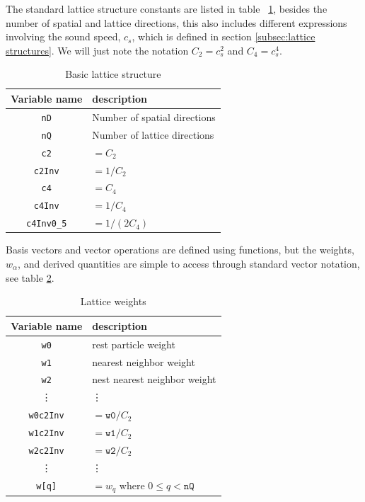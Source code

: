 \documentclass[11pt,a4paper]{report}
\begin{document}
The standard lattice structure constants are listed in table ~\ref{tab:basic lattice structure}, besides the number of spatial and lattice directions, this also includes different expressions involving the sound speed, $c_s$, which is defined in section \ref{subsec:lattice structures}. We will just note the notation $C_2=c_s^2$ and $C_4=c_s^4$.   
\begin{table}[h]
	\centering
	\begin{tabular}{|c|l|}\hline
		Variable name & description \\ \hline
		\texttt{nD} & Number of spatial directions \\ 
		\texttt{nQ} & Number of lattice directions \\ \hline
		\texttt{c2} & $=C_2$ \\ 
		\texttt{c2Inv} & $=1/C_2$ \\ \hline
		\texttt{c4} & $=C_4$ \\ 
		\texttt{c4Inv} & $=1/C_4$ \\ 
		\texttt{c4Inv0{\_}5} & $=1/(2C_4)$ \\ \hline
	\end{tabular}
	\caption{Basic lattice structure}
	\label{tab:basic lattice structure}
\end{table}
Basis vectors and vector operations are defined using functions, but the weights, $w_\alpha$, and derived quantities are simple to access through standard vector notation, see table \ref{tab:lattice weights}.
\begin{table}
	\centering
	\begin{tabular}{|c|l|}\hline
		Variable name & description \\ \hline
		\texttt{w0} & rest particle weight \\ 
		\texttt{w1} & nearest neighbor weight \\ 
		\texttt{w2} & nest nearest neighbor weight \\ 
		\vdots & \vdots \\ \hline
		\texttt{w0c2Inv} & $=\texttt{w0}/C_2$ \\ 
		\texttt{w1c2Inv} & $=\texttt{w1}/C_2$ \\ 
		\texttt{w2c2Inv} & $=\texttt{w2}/C_2$ \\ 
		\vdots & \vdots \\ \hline
		\texttt{w[q]} & $=w_q$ where $0\leq q < \texttt{nQ}$ \\ \hline
	\end{tabular}
	\caption{Lattice weights}
	\label{tab:lattice weights}
\end{table}
\end{document}
